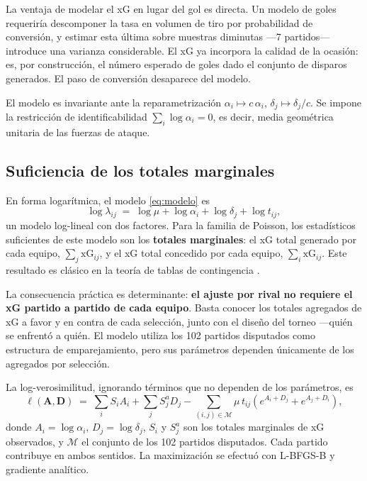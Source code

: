 \documentclass[11pt,a4paper]{article}
\newcommand{\xG}{\mathrm{xG}}
\begin{document}
La ventaja de modelar el xG en lugar del gol es directa. Un modelo de goles requeriría descomponer la tasa en volumen de tiro por probabilidad de conversión, y estimar esta última sobre muestras diminutas ---7 partidos--- introduce una varianza considerable. El xG ya incorpora la calidad de la ocasión: es, por construcción, el número esperado de goles dado el conjunto de disparos generados. El paso de conversión desaparece del modelo.

El modelo es invariante ante la reparametrización $\alpha_i \mapsto c\,\alpha_i$, $\delta_j \mapsto \delta_j/c$. Se impone la restricción de identificabilidad $\sum_i \log\alpha_i = 0$, es decir, media geométrica unitaria de las fuerzas de ataque.

\subsection{Suficiencia de los totales marginales}

En forma logarítmica, el modelo \eqref{eq:modelo} es
\begin{equation}
\log\lambda_{ij} \;=\; \log\mu + \log\alpha_i + \log\delta_j + \log t_{ij},
\end{equation}
un modelo log-lineal con dos factores. Para la familia de Poisson, los estadísticos suficientes de este modelo son los \textbf{totales marginales}: el xG total generado por cada equipo, $\sum_j \xG_{ij}$, y el xG total concedido por cada equipo, $\sum_i \xG_{ij}$. Este resultado es clásico en la teoría de tablas de contingencia \citep{birch1963, demingstephan1940}.

La consecuencia práctica es determinante: \textbf{el ajuste por rival no requiere el xG partido a partido de cada equipo}. Basta conocer los totales agregados de xG a favor y en contra de cada selección, junto con el diseño del torneo ---quién se enfrentó a quién. El modelo utiliza los 102 partidos disputados como estructura de emparejamiento, pero sus parámetros dependen únicamente de los agregados por selección.

La log-verosimilitud, ignorando términos que no dependen de los parámetros, es
\begin{equation}
\ell(\boldsymbol{A}, \boldsymbol{D}) \;=\; \sum_i S_i A_i + \sum_j S^a_j D_j - \sum_{(i,j)\in\mathcal{M}} \mu\, t_{ij}\left(e^{A_i + D_j} + e^{A_j + D_i}\right),
\label{eq:loglik}
\end{equation}
donde $A_i = \log\alpha_i$, $D_j = \log\delta_j$, $S_i$ y $S^a_j$ son los totales marginales de xG observados, y $\mathcal{M}$ el conjunto de los 102 partidos disputados. Cada partido contribuye en ambos sentidos. La maximización se efectuó con L-BFGS-B y gradiente analítico.
\end{document}
